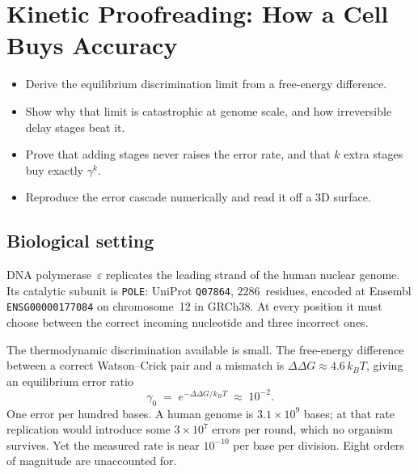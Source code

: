 \section{Kinetic Proofreading: How a Cell Buys Accuracy}\label{sec:proofreading}

\begin{objectives}
\begin{itemize}[leftmargin=*,itemsep=1pt,topsep=1pt]
  \item Derive the equilibrium discrimination limit from a free-energy difference.
  \item Show why that limit is catastrophic at genome scale, and how irreversible delay stages beat it.
  \item Prove that adding stages never raises the error rate, and that $k$ extra stages buy exactly $\gamma^k$.
  \item Reproduce the error cascade numerically and read it off a 3D surface.
\end{itemize}
\end{objectives}

\subsection{Biological setting}

DNA polymerase~$\varepsilon$ replicates the leading strand of the human nuclear
genome. Its catalytic subunit is \texttt{POLE}: UniProt \texttt{Q07864},
$2286$~residues, encoded at Ensembl \texttt{ENSG00000177084} on chromosome~12 in
GRCh38. At every position it must choose between the correct incoming nucleotide
and three incorrect ones.

The thermodynamic discrimination available is small. The free-energy difference
between a correct Watson--Crick pair and a mismatch is
$\Delta\Delta G \approx 4.6\,k_BT$, giving an equilibrium error ratio
\begin{equation}\label{eq:gamma0}
  \gamma_0 \;=\; e^{-\Delta\Delta G/k_BT} \;\approx\; 10^{-2}.
\end{equation}
One error per hundred bases. A human genome is $3.1\times10^9$ bases; at that
rate replication would introduce some $3\times10^7$ errors per round, which no
organism survives. Yet the measured rate is near $10^{-10}$ per base per
division. Eight orders of magnitude are unaccounted for.

